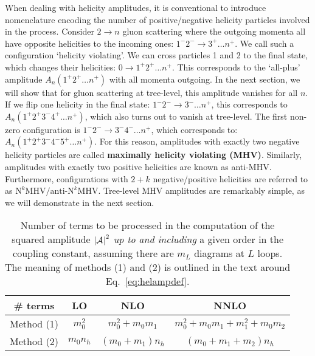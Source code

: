 \documentclass[main.tex]{subfiles}
\begin{document}
When dealing with helicity amplitudes, it is conventional to introduce nomenclature encoding the number of positive/negative helicity particles involved in the process. Consider $2\rightarrow n$ gluon scattering where the outgoing momenta all have opposite helicities to the incoming ones: $1^-2^- \rightarrow 3^+ \ldots n^+$. We call such a configuration `helicity violating'. We can cross particles 1 and 2 to the final state, which changes their helicities: $0\rightarrow 1^+2^+ \ldots n^+$. This corresponds to the `all-plus' amplitude $A_n(1^+2^+ \ldots n^+)$ with all momenta outgoing. In the next section, we will show that for gluon scattering at tree-level, this amplitude vanishes for all $n$. If we flip one helicity in the final state: $1^-2^- \rightarrow 3^- \ldots n^+$, this corresponds to $A_n(1^+2^+3^-4^+ \ldots n^+)$, which also turns out to vanish at tree-level. The first non-zero configuration is $1^-2^- \rightarrow 3^-4^- \ldots n^+$, which corresponds to: $A_n(1^+2^+3^-4^-5^+ \ldots n^+)$. For this reason, amplitudes with exactly two negative helicity particles are called \textbf{maximally helicity violating (MHV)}. Similarly, amplitudes with exactly two positive helicities are known as anti-MHV. Furthermore, configurations with $2+k$ negative/positive helicities are referred to as $\text{N}^k\text{MHV}/\text{anti-N}^k\text{MHV}$. Tree-level MHV amplitudes are remarkably simple, as we will demonstrate in the next section. 
\begin{table}[t]
	\begin{center}
		\begin{tabular}{c|c|c|c}
			  \# terms & LO & NLO & NNLO \\
			\hline
			Method (1) & $m_0^2$ & $m_0^2 + m_0 m_1$ & $m_0^2 + m_0 m_1 + m_1^2 + m_0 m_2$ \\
			Method (2) & $m_0 n_h$ & $(m_0+m_1)n_h$ & $(m_0+m_1+m_2)n_h$ \\
		\end{tabular}
	\end{center}
 \caption{Number of terms to be processed in the computation of the squared amplitude $\left|\mathcal{A}_{}^{}\right|^2$ \textit{up to and including} a given order in the coupling constant, assuming there are $m_L$ diagrams at $L$ loops. The meaning of methods (1) and (2) is outlined in the text around Eq.~\ref{eq:helampdef}.}
 \label{tab:nterms}
\end{table}
\end{document}
